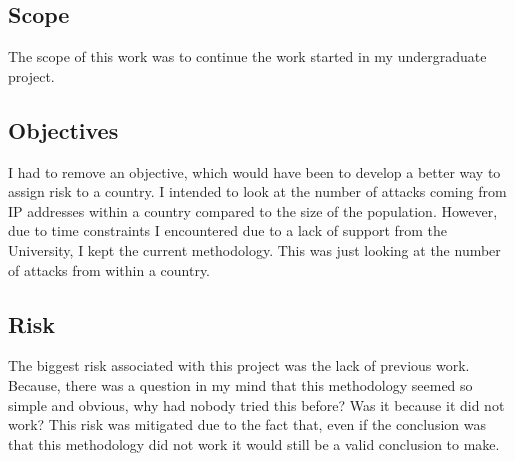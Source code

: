 \subsection{Scope}

The scope of this work was to continue the work started in my undergraduate project.


\subsection{Objectives}

I had to remove an objective, which would have been to develop a better way to assign risk to a country. I intended to look at the number of attacks coming from IP addresses within a country compared to the size of the population. However, due to time constraints I encountered due to a lack of support from the University, I kept the current methodology. This was just looking at the number of attacks from within a country.

\subsection{Risk}

The biggest risk associated with this project was the lack of previous work. Because, there was a question in my mind that this methodology seemed so simple and obvious, why had nobody tried this before? Was it because it did not work? This risk was mitigated due to the fact that, even if the conclusion was that this methodology did not work it would still be a valid conclusion to make.
